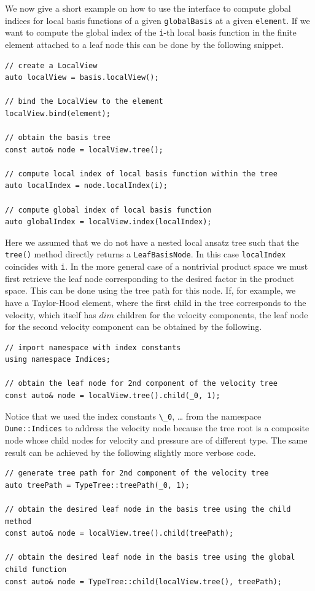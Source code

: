 \documentclass[a4paper,10pt,headings=normal,bibliography=totoc]{scrartcl}
\newcommand{\cpp}[1]{\lstinline[basicstyle=\ttfamily]!#1!}
\begin{document}
We now give a short example on how to use the interface
to compute global indices for local basis functions
of a given \cpp{globalBasis} at a given \cpp{element}.
If we want to compute the global index of the \cpp{i}-th
local basis function in the finite element attached to
a leaf node this can be done by the following snippet.

\begin{lstlisting}[style=Example]
// create a LocalView
auto localView = basis.localView();

// bind the LocalView to the element
localView.bind(element);

// obtain the basis tree
const auto& node = localView.tree();

// compute local index of local basis function within the tree
auto localIndex = node.localIndex(i);

// compute global index of local basis function
auto globalIndex = localView.index(localIndex);
\end{lstlisting}

Here we assumed that we do not have a nested local ansatz tree
such that the \cpp{tree()} method directly returns a \cpp{LeafBasisNode}.
In this case \cpp{localIndex} coincides with \cpp{i}.
In the more general case of a nontrivial product space
we must first retrieve the leaf node corresponding to
the desired factor in the product space. This can be done
using the tree path for this node. If, for example,
we have a Taylor-Hood element, where the first
child in the tree corresponds to the velocity,
which itself has $dim$ children for the velocity
components, the leaf node for the second velocity
component can be obtained by the following.

\begin{lstlisting}[style=Example]
// import namespace with index constants
using namespace Indices;

// obtain the leaf node for 2nd component of the velocity tree
const auto& node = localView.tree().child(_0, 1);
\end{lstlisting}

Notice that we used the index constants \cpp{\_0}, \dots{}
from the namespace \cpp{Dune::Indices}
to address the velocity node because the
tree root is a composite node whose child nodes
for velocity and pressure are of different type.
The same result can be achieved by the following
slightly more verbose code.

\begin{lstlisting}[style=Example]
// generate tree path for 2nd component of the velocity tree
auto treePath = TypeTree::treePath(_0, 1);

// obtain the desired leaf node in the basis tree using the child method
const auto& node = localView.tree().child(treePath);

// obtain the desired leaf node in the basis tree using the global child function
const auto& node = TypeTree::child(localView.tree(), treePath);
\end{lstlisting}
\end{document}
